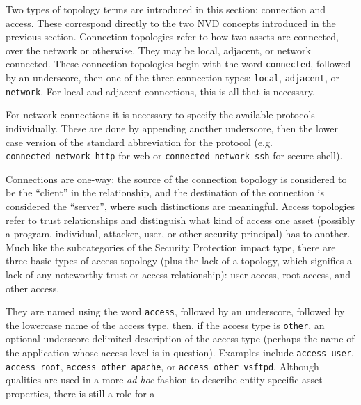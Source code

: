 Two types of topology terms are introduced in this section: connection and access. These
correspond directly to the two NVD concepts introduced in the previous section.
Connection topologies refer to how two assets are connected, over the network or otherwise.
They may be local, adjacent, or network connected. These connection topologies begin with
the word \texttt{connected}, followed by an underscore, then one of the three connection
types: \texttt{local}, \texttt{adjacent}, or \texttt{network}. For local and adjacent
connections, this is all that is necessary. 

For network connections it is
necessary to specify the available protocols individually. These are done by appending another
underscore, then the lower case version of the standard abbreviation for the protocol
(e.g. \texttt{connected\_network\_http} for web or \texttt{connected\_network\_ssh} for
secure shell).

Connections are one-way: the source of the connection topology is considered to be the
``client'' in the relationship, and the destination of the connection is considered
the ``server'', where such distinctions are meaningful.
Access topologies refer to trust relationships and distinguish what kind of access one
asset (possibly a program, individual, attacker, user, or other security principal) has
to another. Much like the subcategories of the Security Protection impact type,
there are three basic types of access topology (plus the lack of a topology, which
signifies a lack of any noteworthy trust or access relationship): user access,
root access, and other access.

They are named using the word \texttt{access}, followed by an underscore, followed
by the lowercase name of the access type, then, if the access type is \texttt{other},
an optional underscore delimited description of the access type (perhaps the name
of the application whose access level is in question). Examples include
\texttt{access\_user}, \texttt{access\_root}, \texttt{access\_other\_apache}, or
\texttt{access\_other\_vsftpd}.
Although qualities are used in a more \emph{ad hoc} fashion to describe entity-specific
asset properties, there is still a role for a 

